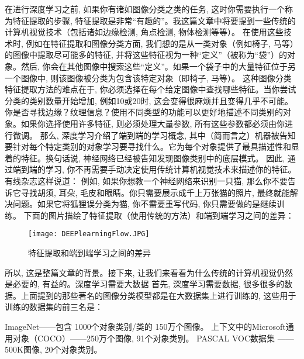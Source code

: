 在进行深度学习之前, 如果你有诸如图像分类之类的任务, 这时你需要执行一个称为特征提取的步骤, 特征提取是非常“有趣的”。我这篇文章中将要提到一些传统的计算机视觉技术（包括诸如边缘检测, 角点检测, 物体检测等等）。
在使用这些技术时, 例如在特征提取和图像分类方面, 我们想的是从一类对象（例如椅子, 马等）的图像中提取尽可能多的特征, 并将这些特征视为一种“定义”（被称为“袋”）的对象。然后, 你会在其他图像中搜索这些“定义”。如果一个袋子中的大量特征位于另一个图像中, 则该图像被分类为包含该特定对象（即椅子, 马等）。
这种图像分类特征提取方法的难点在于, 你必须选择在每个给定图像中查找哪些特征。当你尝试分类的类别数量开始增加, 例如10或20时, 这会变得很麻烦并且变得几乎不可能。你是否寻找边缘？纹理信息？使用不同类型的功能可以更好地描述不同类别的对象。如果你选择使用许多特征, 则必须处理大量参数, 所有这些参数都必须由你进行微调。
那么, 深度学习介绍了端到端的学习概念, 其中（简而言之）机器被告知要针对每个特定类别的对象学习要寻找什么。它为每个对象提供了最具描述性和显着的特征。换句话说, 神经网络已经被告知发现图像类别中的底层模式。
因此, 通过端到端的学习, 你不再需要手动决定使用传统计算机视觉技术来描述你的特征。有线杂志这样说道：
例如, 如果你想教一个神经网络来识别一只猫, 那么你不要告诉它寻找胡须, 耳朵, 毛皮和眼睛。你只需要展示成千上万张猫的照片, 最终就能解决问题。如果它将狐狸误分类为猫, 你不需要重写代码, 你只需要做的是继续训练。
下面的图片描绘了特征提取（使用传统的方法）和端到端学习之间的差异：
\begin{figure}[H]
\centering
\texttt{[image: DEEPlearningFlow.JPG]}
\caption{特征提取和端到端学习之间的差异}
\label{DEEPlearningFlow}
\end{figure}
所以, 这是整篇文章的背景。接下来, 让我们来看看为什么传统的计算机视觉仍然是必要的, 有益的。深度学习需要大数据
首先, 深度学习需要数据, 很多很多的数据。上面提到的那些著名的图像分类模型都是在大数据集上进行训练的, 这些用于训练的数据集的前三名是：

ImageNet——包含 1000个对象类别/类的 150万个图像。
上下文中的Microsoft通用对象（COCO）——250万个图像, 91个对象类别。
PASCAL VOC数据集 ——500K图像, 20个对象类别。


